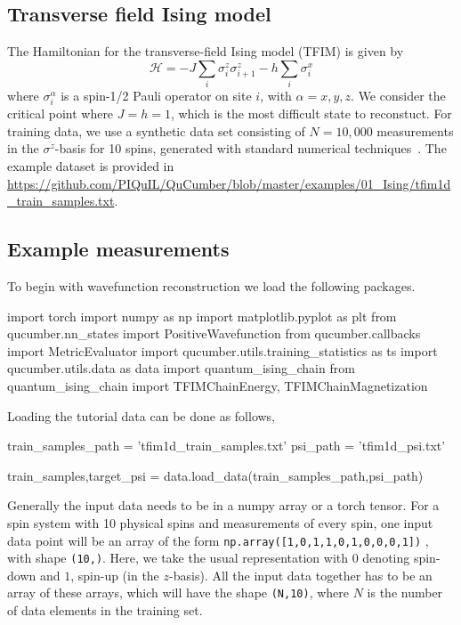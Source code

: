 \documentclass[submission, Phys]{SciPost}
\begin{document}
\subsection{Transverse field Ising model}
\label{Sec:Training_TFIM}

The Hamiltonian for the transverse-field Ising model (TFIM) is given by
\begin{equation}
	\mathcal{H} = -J\sum_i \sigma^z_i \sigma^z_{i+1} - h \sum_i \sigma^x_i \label{TFIM}	
\end{equation}
where $\sigma^{\alpha}_i$ is a spin-1/2 Pauli operator on site $i$, with $\alpha=x,y,z$. We consider the critical point where $J=h=1$, which is the most difficult state to reconstuct.
For training data, we use a synthetic data set consisting of $N=10,000$ measurements in the $\sigma^z$-basis for 10 spins, generated with standard numerical techniques~\cite{itensor}.
The example dataset is provided in \url{https://github.com/PIQuIL/QuCumber/blob/master/examples/01_Ising/tfim1d_train_samples.txt}.


\subsection{Example measurements}
To begin with wavefunction reconstruction we load the following packages.
\begin{python}
import torch
import numpy as np
import matplotlib.pyplot as plt
from qucumber.nn_states import PositiveWavefunction
from qucumber.callbacks import MetricEvaluator
import qucumber.utils.training_statistics as ts
import qucumber.utils.data as data
import quantum_ising_chain
from quantum_ising_chain import TFIMChainEnergy, TFIMChainMagnetization
\end{python}

Loading the tutorial data can be done as follows,

\begin{python}
train_samples_path = 'tfim1d_train_samples.txt'
psi_path           = 'tfim1d_psi.txt'

train_samples,target_psi = data.load_data(train_samples_path,psi_path)
\end{python}

Generally the input data needs to be in a numpy array or a torch tensor.
For a spin system with 10 physical spins and measurements of every spin, one input data point will be an array of the form
\verb|np.array([1,0,1,1,0,1,0,0,0,1])|
, with shape \verb|(10,)|.
Here, we take the usual representation with $0$ denoting spin-down and $1$, spin-up (in the $z$-basis).
All the input data together has to be an array of these arrays, which will have the shape \verb|(N,10)|, where $N$ is the number of data elements in the training set.
\end{document}
